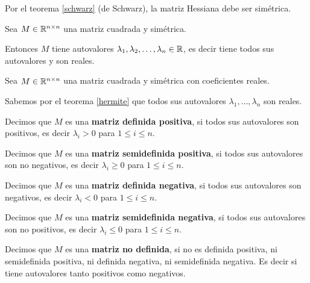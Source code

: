 \begin{observation} \label{hessiana_simetrica}
Por el teorema \ref{schwarz} (de Schwarz), la matriz Hessiana debe ser simétrica.
\end{observation}

\begin{theorem} \label{hermite}
Sea $M \in \mathbb{R}^{n \times n}$ una matriz cuadrada y simétrica.

Entonces $M$ tiene autovalores $\lambda_1, \lambda_2, \ldots, \lambda_n \in \mathbb{R}$, es decir tiene todos sus autovalores y son reales.
\end{theorem}

\begin{definition} \label{definida_positiva}

Sea $M \in \mathbb{R}^{n \times n}$ una matriz cuadrada y simétrica con coeficientes reales.

Sabemos por el teorema \ref{hermite} que todos sus autovalores $\lambda_1, \ldots, \lambda_n$ son reales.

Decimos que $M$ es una \textbf{matriz definida positiva}, si todos sus autovalores son positivos, es decir $\lambda_i > 0$ para $1 \leq i \leq n$.

Decimos que $M$ es una \textbf{matriz semidefinida positiva}, si todos sus autovalores son no negativos, es decir $\lambda_i \geq 0$ para $1 \leq i \leq n$.

Decimos que $M$ es una \textbf{matriz definida negativa}, si todos sus autovalores son negativos, es decir $\lambda_i < 0$ para $1 \leq i \leq n$.

Decimos que $M$ es una \textbf{matriz semidefinida negativa}, si todos sus autovalores son no positivos, es decir $\lambda_i \leq 0$ para $1 \leq i \leq n$.

Decimos que $M$ es una \textbf{matriz no definida}, si no es definida positiva, ni semidefinida positiva, ni definida negativa, ni semidefinida negativa.  Es decir si tiene autovalores tanto positivos como negativos.
\end{definition}

